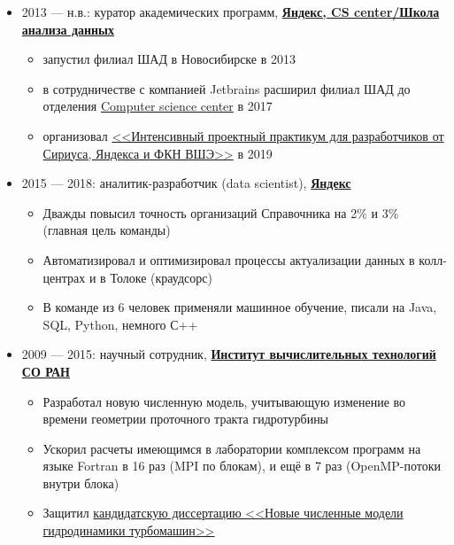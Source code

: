 \documentclass[11pt]{article}
\begin{document}
\begin{itemize}
	\item 2013 — н.в.: куратор академических программ, \textbf{\href{https://compscicenter.ru}{Яндекс, CS center/Школа анализа данных}}
	\begin{itemize}
		\item запустил филиал ШАД в Новосибирске в 2013
		\item в сотрудничестве с компанией Jetbrains расширил филиал ШАД до отделения \href{https://compscicenter.ru}{Computer science center} в 2017
		\item организовал \href{https://sochisirius.ru/obuchenie/graduates/smena240/1174}{<<Интенсивный проектный практикум для разработчиков от Сириуса, Яндекса и ФКН ВШЭ>>} в 2019
	\end{itemize}

	\item 2015 — 2018: аналитик-разработчик (data scientist), \textbf{\href{https://yandex.ru/}{Яндекс}}
	\begin{itemize}
		\item Дважды повысил точность организаций Справочника на 2\% и 3\% (главная цель команды)
		\item Автоматизировал и оптимизировал процессы актуализации данных в колл-центрах и в Толоке (краудсорс)
		\item В команде из 6 человек применяли машинное обучение, писали на Java, SQL, Python, немного С++
	\end{itemize}

	\item 2009 — 2015: научный сотрудник, \textbf{\href{http://www.ict.nsc.ru}{Институт вычислительных технологий СО РАН}}
	\begin{itemize}
		\item Разработал новую численную модель, учитывающую изменение во времени геометрии проточного тракта гидротурбины
		\item Ускорил расчеты имеющимся в лаборатории комплексом программ на языке Fortran в 16 раз (MPI по блокам), и ещё в 7 раз (OpenMP-потоки внутри блока)
		\item Защитил \href{https://github.com/avalur/dissertation/blob/master/to_print/autoref_Avdyushenko.pdf}{кандидатскую диссертацию <<Новые численные модели гидродинамики турбомашин>>}
	\end{itemize}
\end{itemize}
\end{document}
